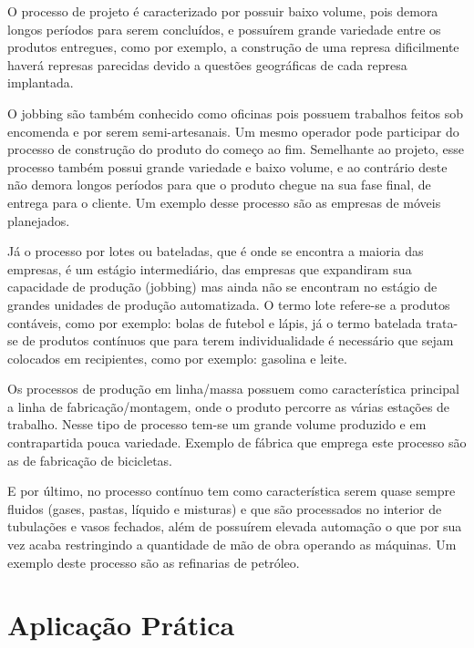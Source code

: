 O processo de projeto é caracterizado por possuir baixo volume, pois demora longos períodos para serem concluídos, e possuírem grande variedade entre os produtos entregues, como por exemplo, a construção de uma represa dificilmente haverá represas parecidas devido a questões geográficas de cada represa implantada.
\par O jobbing são também conhecido como oficinas pois possuem trabalhos feitos sob encomenda e por serem semi-artesanais. Um mesmo operador pode participar do processo de construção do produto do começo ao fim. Semelhante ao projeto, esse processo também possui grande variedade e baixo volume, e ao contrário deste não demora longos períodos para que o produto chegue na sua fase final, de entrega para o cliente. Um exemplo desse processo são as empresas de móveis planejados.
\par Já o processo por lotes ou bateladas, que é onde se encontra a maioria das empresas, é um estágio intermediário, das empresas que expandiram sua capacidade de produção (jobbing) mas ainda não se encontram no estágio de grandes unidades de produção automatizada. O termo lote refere-se a produtos contáveis, como por exemplo: bolas de futebol e lápis, já o termo batelada trata-se de produtos contínuos que para terem individualidade é necessário que sejam colocados em recipientes, como por exemplo: gasolina e leite. 
\par Os processos de produção em linha/massa possuem como característica principal a linha de fabricação/montagem, onde o produto percorre as várias estações de trabalho. Nesse tipo de processo tem-se um grande volume produzido e em contrapartida pouca variedade. Exemplo de fábrica que emprega este processo são as de fabricação de bicicletas.
\par E por último, no processo contínuo tem como característica serem quase sempre fluidos (gases, pastas, líquido e misturas) e que são processados no interior de tubulações e vasos fechados, além de possuírem elevada automação o que por sua vez acaba restringindo a quantidade de mão de obra operando as máquinas. Um exemplo deste processo são as refinarias de petróleo.


\section{Aplicação Prática}
\label{sec:tipos_de_processo_de_producao_aplicacao}